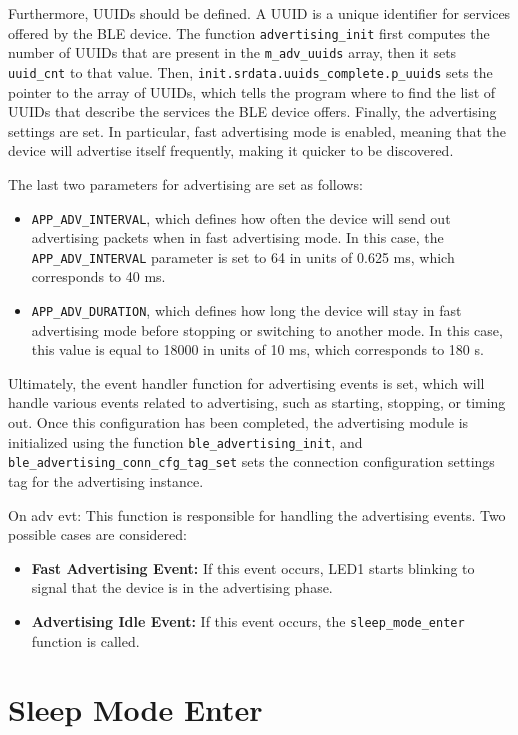\documentclass{Configuration_Files/PoliMi3i_thesis}
\begin{document}
Furthermore, UUIDs should be defined. A UUID is a unique identifier for services offered by the BLE device. The function \texttt{advertising\_init} first computes the number of UUIDs that are present in the \texttt{m\_adv\_uuids} array, then it sets \texttt{uuid\_cnt} to that value. Then, \texttt{init.srdata.uuids\_complete.p\_uuids} sets the pointer to the array of UUIDs, which tells the program where to find the list of UUIDs that describe the services the BLE device offers. Finally, the advertising settings are set. In particular, fast advertising mode is enabled, meaning that the device will advertise itself frequently, making it quicker to be discovered. 

The last two parameters for advertising are set as follows:
\begin{itemize}
    \item \texttt{APP\_ADV\_INTERVAL}, which defines how often the device will send out advertising packets when in fast advertising mode. In this case, the \texttt{APP\_ADV\_INTERVAL} parameter is set to 64 in units of 0.625 ms, which corresponds to 40 ms.
    \item \texttt{APP\_ADV\_DURATION}, which defines how long the device will stay in fast advertising mode before stopping or switching to another mode. In this case, this value is equal to 18000 in units of 10 ms, which corresponds to 180 s.
\end{itemize}

Ultimately, the event handler function for advertising events is set, which will handle various events related to advertising, such as starting, stopping, or timing out. Once this configuration has been completed, the advertising module is initialized using the function \texttt{ble\_advertising\_init}, and \texttt{ble\_advertising\_conn\_cfg\_tag\_set} sets the connection configuration settings tag for the advertising instance.


On adv evt: This function is responsible for handling the advertising events. Two possible cases are considered:
\begin{itemize}
    \item \textbf{Fast Advertising Event:} If this event occurs, LED1 starts blinking to signal that the device is in the advertising phase.
    \item \textbf{Advertising Idle Event:} If this event occurs, the \texttt{sleep\_mode\_enter} function is called.
\end{itemize}

\section*{Sleep Mode Enter}
\end{document}
